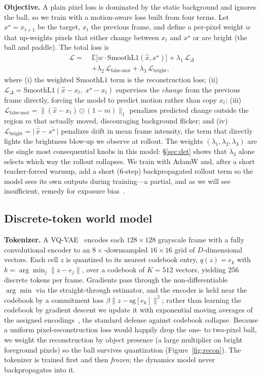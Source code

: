 \documentclass[10pt,twocolumn,letterpaper]{article}
\begin{document}
\textbf{Objective.} A plain pixel loss is dominated by the static background and
ignores the ball, so we train with a motion-aware loss built from four terms.
Let $x^\star=x_{t+1}$ be the target, $x_t$ the previous frame, and define a
per-pixel weight $w$ that up-weights pixels that either change between $x_t$ and
$x^\star$ or are bright (the ball and paddle). The total loss is
\begin{align}
\mathcal{L} =\;& \mathbb{E}\big[w \cdot \mathrm{SmoothL1}(\hat{x},x^\star)\big]
  + \lambda_1\,\mathcal{L}_{\Delta} \nonumber\\
  &+ \lambda_2\,\mathcal{L}_{\text{false-mot}}
  + \lambda_3\,\mathcal{L}_{\text{bright}} ,
\end{align}
where (i) the weighted $\mathrm{SmoothL1}$ term is the reconstruction loss; (ii)
$\mathcal{L}_{\Delta}=\mathrm{SmoothL1}(\hat{x}-x_t,\;x^\star-x_t)$ supervises the
\emph{change} from the previous frame directly, forcing the model to predict motion
rather than copy $x_t$; (iii)
$\mathcal{L}_{\text{false-mot}}=\lVert(\hat{x}-x_t)\odot(1-m)\rVert_1$ penalizes
predicted change outside the region $m$ that actually moved, discouraging
background flicker; and (iv)
$\mathcal{L}_{\text{bright}}=\lvert\,\overline{\hat{x}}-\overline{x^\star}\,\rvert$
penalizes drift in mean frame intensity, the term that directly fights the
brightness blow-up we observe at rollout. The weights
$(\lambda_1,\lambda_2,\lambda_3)$ are the single most consequential knobs in this
model: \S\ref{sec:det} shows that $\lambda_3$ alone selects which way the rollout
collapses. We train with AdamW and, after a short teacher-forced warmup, add a
short ($6$-step) backpropagated rollout term so the model sees its own outputs
during training---a partial, and as we will see insufficient, remedy for exposure
bias~\cite{bengio2015scheduled}.

\subsection{Discrete-token world model}
\textbf{Tokenizer.} A VQ-VAE~\cite{oord2017vqvae} encodes each $128\times128$
grayscale frame with a fully convolutional encoder to an $8\times$-downsampled
$16\times16$ grid of $D$-dimensional vectors. Each cell $z$ is quantized to its
nearest codebook entry, $q(z)=e_{k}$ with $k=\arg\min_j\lVert z-e_j\rVert$, over a
codebook of $K{=}512$ vectors, yielding $256$ discrete tokens per frame.
Gradients pass through the non-differentiable $\arg\min$ via the
straight-through estimator, and the encoder is held near the codebook by a
commitment loss $\beta\lVert z-\mathrm{sg}[e_k]\rVert^2$; rather than learning the
codebook by gradient descent we update it with exponential moving averages of the
assigned encodings~\cite{oord2017vqvae}, the standard defense against codebook
collapse. Because a uniform pixel-reconstruction loss would happily drop the
one- to two-pixel ball, we weight the reconstruction by object presence (a large
multiplier on bright foreground pixels) so the ball survives quantization
(Figure~\ref{fig:recon}). The tokenizer is trained first and then \emph{frozen};
the dynamics model never backpropagates into it.
\end{document}

